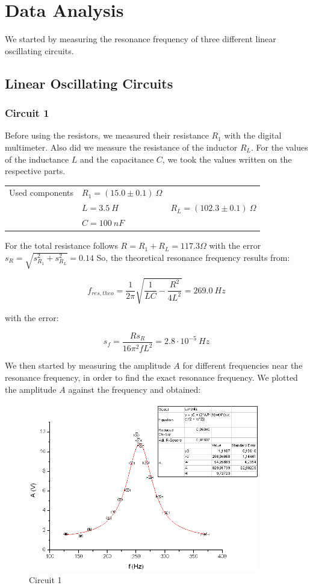 \section{Data Analysis}

We started by measuring the resonance frequency of three different linear oscillating circuits.

\subsection{Linear Oscillating Circuits}

\subsubsection{Circuit 1}

Before using the resistors, we measured their resistance $R_1$ with the digital multimeter. Also did we measure the resistance of the inductor $R_L$. For the values of the inductance $L$ and the capacitance $C$, we took the values written on the respective parts.

\begin{tabular}{l l l}
Used components & $R_1 = (15.0 \pm 0.1)\ \Omega$ & \\
 & $L=3.5\ H$ & $R_L = (102.3 \pm 0.1)\ \Omega$\\
 & $C=100\ nF$ & \\
\end{tabular}

For the total resistance follows $R = R_1 + R_L = 117.3 \Omega$ with the error $s_R = \sqrt{s_{R_1}^2 + s_{R_L}^2} = 0.14$ 
So, the theoretical resonance frequency results from:

$$f_{res,theo} = \frac{1}{2\pi}\sqrt{\frac{1}{LC}-\frac{R^2}{4L^2}} = 269.0\ Hz$$

with the error:

$$s_f = \frac{Rs_R}{16\pi^2fL^2} = 2.8\cdot 10^{-5}\ Hz$$

We then started by measuring the amplitude $A$ for different frequencies near the resonance frequency, in order to find the exact resonance frequency. We plotted the amplitude $A$ against the frequency and obtained:

\begin{figure}[H]
\centering \includegraphics[width=0.9\textwidth]{Bilder/1a.png}
\caption{Circuit 1}
\end{figure}

